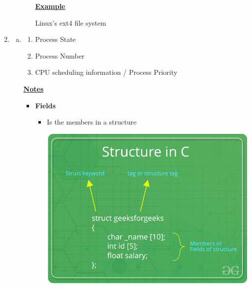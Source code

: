 \documentclass[12pt]{article}
\begin{document}
\begin{enumerate}[1.]
\begin{enumerate}[a)]
\begin{itemize}
            \bigskip

            \underline{\textbf{Example}}

            \bigskip

            Linux's ext4 file system
        \end{itemize}
    \end{enumerate}

    \item

    \bigskip

    \begin{enumerate}[a)]

        \item

        \begin{enumerate}[1)]
            \item Process State
            \item Process Number
            \item CPU scheduling information / Process Priority
        \end{enumerate}

        \bigskip

        \underline{\textbf{Notes}}

        \begin{itemize}
            \item \textbf{Fields}

            \begin{itemize}
                \item Is the members in a structure

                \bigskip

                \begin{center}
                \includegraphics[width=0.6\linewidth]{images/midterm_1_solution_15.png}
                \end{center}
            \end{itemize}


\end{itemize}
\end{enumerate}
\end{enumerate}
\end{document}

